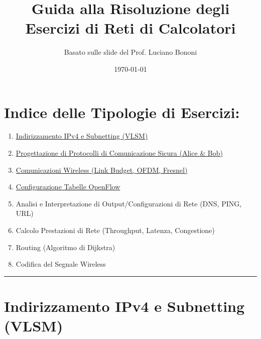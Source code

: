

\title{Guida alla Risoluzione degli Esercizi di Reti di Calcolatori}
\author{Basato sulle slide del Prof. Luciano Bononi}
\date{\today}



\maketitle
\tableofcontents
\newpage


\section*{Indice delle Tipologie di Esercizi:}
\begin{enumerate}[label=\arabic*.] %
    \item \hyperref[sec:ipv4-subnetting]{Indirizzamento IPv4 e Subnetting (VLSM)}
    \item \hyperref[sec:protocolli-sicuri]{Progettazione di Protocolli di Comunicazione Sicura (Alice \& Bob)}
    \item \hyperref[sec:wireless]{Comunicazioni Wireless (Link Budget, OFDM, Fresnel)}
    \item \hyperref[sec:openflow]{Configurazione Tabelle OpenFlow}
    \item Analisi e Interpretazione di Output/Configurazioni di Rete (DNS, PING, URL) %
    \item Calcolo Prestazioni di Rete (Throughput, Latenza, Congestione) %
    \item Routing (Algoritmo di Dijkstra) %
    \item Codifica del Segnale Wireless %
\end{enumerate}

\hrule %

\section{Indirizzamento IPv4 e Subnetting (VLSM)} %
\label{sec:ipv4-subnetting} %

